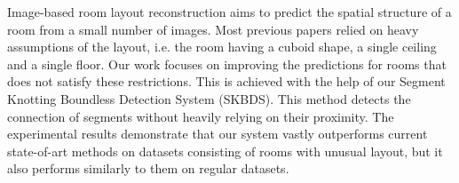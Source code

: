 Image-based room layout reconstruction aims to predict the spatial structure of a room from a small number of images. Most previous papers relied on heavy assumptions of the layout, i.e. the room having a cuboid shape, a single ceiling and a single floor. Our work focuses on improving the predictions for rooms that does not satisfy these restrictions. This is achieved with the help of our Segment Knotting Boundless Detection System (SKBDS). This method detects the connection of segments without heavily relying on their proximity. The experimental results demonstrate that our system vastly outperforms current state-of-art methods on datasets consisting of rooms with unusual layout, but it also performs similarly to them on regular datasets.
